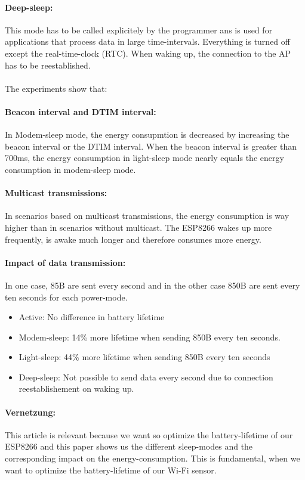 \documentclass{report}
\begin{document}
\paragraph{Deep-sleep:} This mode has to be called explicitely by the programmer ans is used for applications that process data in large time-intervals. Everything is turned off except the real-time-clock (RTC). When waking up, the connection to the AP has to be reestablished.\\\\
The experiments show that:
\paragraph{Beacon interval and DTIM interval:} 
In Modem-sleep mode, the energy consupmtion is decreased by increasing the beacon interval or the DTIM interval. When the beacon interval is greater than 700ms, the energy consumption in light-sleep mode nearly equals the energy consumption in modem-sleep mode.
\paragraph{Multicast transmissions:}
In scenarios based on multicast transmissions, the energy consumption is way higher than in scenarios without multicast. The ESP8266 wakes up more frequently, is awake much longer and therefore consumes more energy.
\paragraph{Impact of data transmission:}
In one case, 85B are sent every second and in the other case 850B are sent every ten seconds for each power-mode.
\begin{itemize}
        \item Active: No difference in battery lifetime
        \item Modem-sleep: 14\% more lifetime when sending 850B every ten seconds.
        \item Light-sleep: 44\% more lifetime when sending 850B every ten seconds
        \item Deep-sleep: Not possible to send data every second due to connection reestablishement on waking up.
    \end{itemize}
\paragraph{Vernetzung:}
This article is relevant because we want so optimize the battery-lifetime of our ESP8266 and this paper shows us the different sleep-modes and the corresponding impact on the energy-consumption. This is fundamental, when we want to optimize the battery-lifetime of our Wi-Fi sensor.
\end{document}
